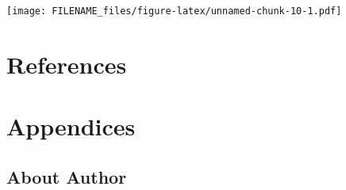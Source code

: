 \documentclass[
]{article}
\begin{document}
\texttt{[image: FILENAME\_files/figure-latex/unnamed-chunk-10-1.pdf]}

\hypertarget{references}{%
\section*{References}\label{references}}

\hypertarget{appendices}{%
\section*{Appendices}\label{appendices}}

\hypertarget{about-author}{%
\subsection*{About Author}\label{about-author}}
\end{document}
